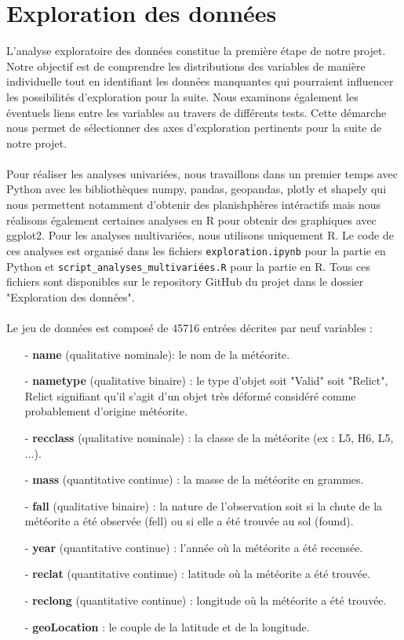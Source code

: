 \documentclass[12pt]{article}
\begin{document}
\section{Exploration des données}
L'analyse exploratoire des données constitue la première étape de notre projet. Notre objectif est de comprendre les distributions des variables de manière individuelle tout en identifiant les données manquantes qui pourraient influencer les possibilités d'exploration pour la suite. Nous examinons également les éventuels liens entre les variables au travers de différents tests. Cette démarche nous permet de sélectionner des axes d'exploration pertinents pour la suite de notre projet.\\
\\
Pour réaliser les analyses univariées, nous travaillons dans un premier temps avec Python avec les bibliothèques numpy, pandas, geopandas, plotly et shapely qui nous permettent notamment d'obtenir des planishphères intéractifs mais nous réalisons également certaines analyses en R pour obtenir des graphiques avec ggplot2. Pour les analyses multivariées, nous utilisons uniquement R. Le code de ces analyses est organisé dans les fichiers \texttt{exploration.ipynb} pour la partie en Python et \texttt{script\_analyses\_multivariées.R} pour la partie en R. Tous ces fichiers sont disponibles sur le repository GitHub du projet dans le dossier "Exploration des données".\\
\\
Le jeu de données est composé de 45716 entrées décrites par neuf variables :

{\setlength{\baselineskip}{1.5\baselineskip} %
\begin{itemize}
\item[-] \textbf{name} (qualitative nominale): le nom de la météorite.
\item[-] \textbf{nametype} (qualitative binaire) : le type d'objet soit "Valid" soit "Relict", Relict signifiant qu'il s'agit d'un objet très déformé considéré comme probablement d'origine météorite.
\item[-] \textbf{recclass} (qualitative nominale) : la classe de la météorite (ex : L5, H6, L5, ...).
\item[-] \textbf{mass} (quantitative continue) : la masse de la météorite en grammes.
\item[-] \textbf{fall} (qualitative binaire) : la nature de l'observation soit si la chute de la météorite a été observée (fell) ou si elle a été trouvée au sol (found).
\item[-] \textbf{year} (quantitative continue) : l'année où la météorite a été recensée.
\item[-] \textbf{reclat} (quantitative continue) : latitude où la météorite a été trouvée.
\item[-] \textbf{reclong} (quantitative continue) : longitude où la météorite a été trouvée.
\item[-] \textbf{geoLocation} : le couple de la latitude et de la longitude.\\
\end{itemize}
} %
\end{document}
